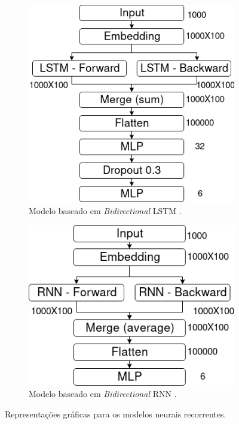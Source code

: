 \begin{figure}[ht]
\begin{subfigure}[b]{0.4\textwidth}
        \includegraphics[width=\textwidth]{figuras/modelos-BLSTM}
        \caption{Modelo baseado em \textit{Bidirectional} LSTM \cite{braz_document_2018}.}
        \label{fig:blstm}
    \end{subfigure}
    \begin{subfigure}[b]{0.45\textwidth}
        \includegraphics[width=\textwidth]{figuras/modelos-BRNN}
        \caption{Modelo baseado em \textit{Bidirectional} RNN \cite{schuster_bidirectional_1997}.}
        \label{fig:brnn}
    \end{subfigure}
    \caption[Modelos recorrentes]{Representações gráficas para os modelos neurais recorrentes.}
\end{figure}


